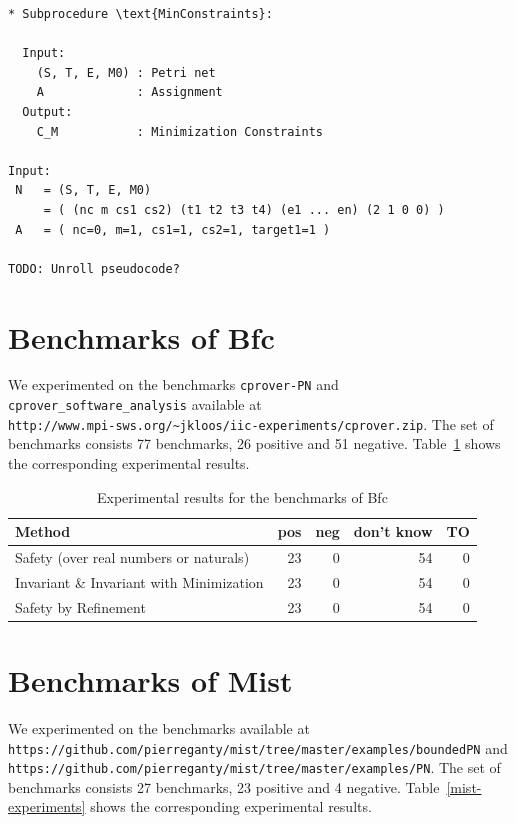 \documentclass{article}
\newcommand{\bfc}{{\sc Bfc}}
\newcommand{\mist}{{\sc Mist}}
\newcommand{\ttt}[1]{\texttt{#1}}
\begin{document}
\begin{verbatim}
* Subprocedure \text{MinConstraints}:

  Input:
    (S, T, E, M0) : Petri net
    A             : Assignment
  Output:
    C_M           : Minimization Constraints

Input:
 N   = (S, T, E, M0)
     = ( (nc m cs1 cs2) (t1 t2 t3 t4) (e1 ... en) (2 1 0 0) )
 A   = ( nc=0, m=1, cs1=1, cs2=1, target1=1 )

TODO: Unroll pseudocode?

\end{verbatim}



\newpage
\section{Benchmarks of \bfc}

We experimented on the benchmarks \ttt{cprover-PN} and
\ttt{cprover\_software\_analysis} available at \\
\ttt{http://www.mpi-sws.org/\~{}jkloos/iic-experiments/cprover.zip}.
The set of benchmarks consists 77 benchmarks, 26 positive and 51 negative.
Table~\ref{bfc-experiments} shows the corresponding experimental results.

\begin{table}[h]
\begin{center}
  \begin{tabular}{ | p{7cm} | r | r | r | r | } %
    \hline
    Method & pos & neg & don't know & TO \\
    \hline
    Safety (over real numbers or naturals)      & 23 &  0 & 54 &  0 \\
    Invariant \& Invariant with Minimization    & 23 &  0 & 54 &  0 \\
    Safety by Refinement                        & 23 &  0 & 54 &  0 \\
    \hline
  \end{tabular}
\end{center}
\caption{Experimental results for the benchmarks of \bfc}
\label{bfc-experiments}
\end{table}

\section{Benchmarks of \mist}

We experimented on the benchmarks available at \\
\ttt{https://github.com/pierreganty/mist/tree/master/examples/boundedPN}
and \\
\ttt{https://github.com/pierreganty/mist/tree/master/examples/PN}.
The set of benchmarks consists 27 benchmarks, 23 positive and 4 negative.
Table~\ref{mist-experiments} shows the corresponding experimental results.
\end{document}
